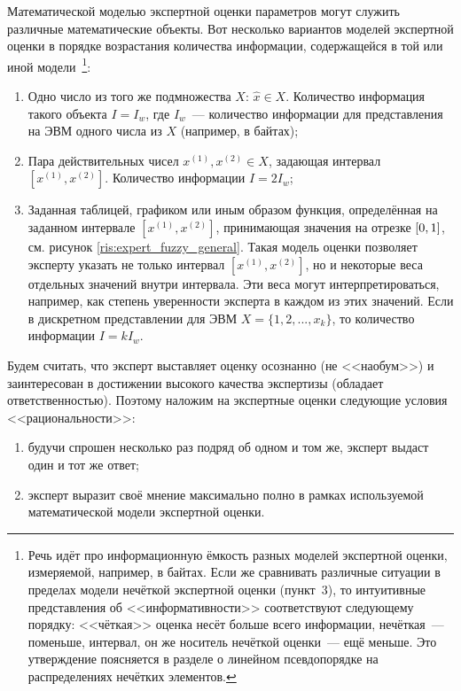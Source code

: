 Математической моделью экспертной оценки параметров могут служить различные математические объекты. Вот несколько вариантов моделей экспертной оценки в порядке возрастания количества информации, содержащейся в той или иной модели~\footnote{Речь идёт про информационную ёмкость разных моделей экспертной оценки, измеряемой, например, в байтах. Если же сравнивать различные ситуации в пределах модели нечёткой экспертной оценки (пункт~3), то интуитивные представления об <<информативности>> соответствуют следующему порядку: <<чёткая>> оценка несёт больше всего информации, нечёткая~--- поменьше, интервал, он же носитель нечёткой оценки~--- ещё меньше. Это утверждение поясняется в разделе  о линейном псевдопорядке на распределениях нечётких элементов.}: 
\begin{enumerate}
  \item Одно число из того же подмножества $X$: $\hat{x} \in X$. Количество информация такого объекта $I = I_w$, где $I_w$~--- количество информации для представления на ЭВМ одного числа из $X$ (например, в байтах);
  \item Пара действительных чисел $x^{(1)}, x^{(2)} \in X$, задающая интервал $[x^{(1)}, x^{(2)}]$. Количество информации $I = 2I_w$;
  \item Заданная таблицей, графиком или иным образом функция, определённая на заданном интервале $[x^{(1)}, x^{(2)}]$, принимающая значения на отрезке $[0,1]$, см. рисунок \ref{ris:expert_fuzzy_general}. Такая модель оценки позволяет эксперту указать не только интервал $[x^{(1)}, x^{(2)}]$, но и некоторые веса отдельных значений внутри интервала. Эти веса могут интерпретироваться, например, как степень уверенности эксперта в каждом из этих значений. Если в дискретном представлении для ЭВМ $X = \{1, 2, ..., x_{k}\}$, то количество информации $I = kI_w$. 
\end{enumerate}

Будем считать, что эксперт выставляет оценку осознанно (не <<наобум>>) и заинтересован в достижении высокого качества экспертизы (обладает ответственностью). Поэтому наложим на экспертные оценки следующие условия <<рациональности>>:
\begin{enumerate}
 \item будучи спрошен несколько раз подряд об одном и том же, эксперт выдаст один и тот же ответ; 
 \item эксперт выразит своё мнение максимально полно в рамках используемой математической модели экспертной оценки.
\end{enumerate}

